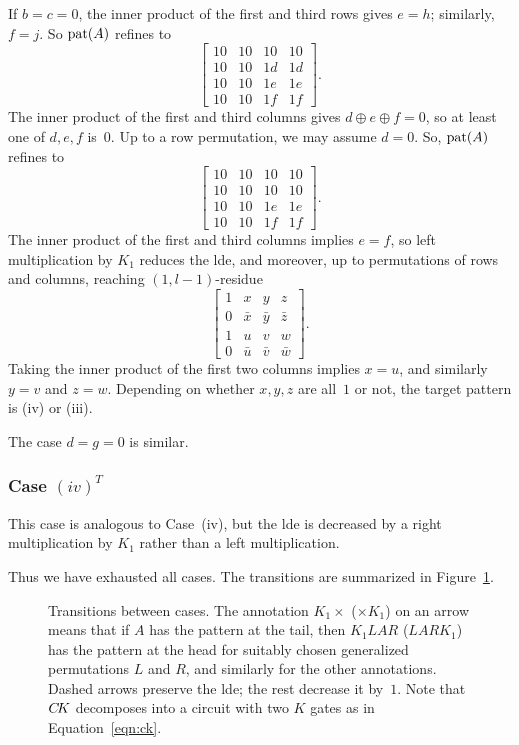 \documentclass[reprint,amsmath,amssymb,aps,pra]{revtex4-2}
\begin{document}
If $b=c=0$, the inner product of the first and third rows gives $e=h$;
similarly, $f=j$. So $\operatorname{pat}(A)$ refines to
\[
  \begin{bmatrix}
    10 & 10 & 10 & 10 \\
    10 & 10 & 1d & 1d \\
    10 & 10 & 1e & 1e \\
    10 & 10 & 1f & 1f
  \end{bmatrix}.
\]
The inner product of the first and third columns gives
$d\oplus e \oplus f = 0$, so at least one of $d,e,f$ is~$0$. Up to a
row permutation, we may assume $d=0$. So, $\operatorname{pat}(A)$ refines to
\[
  \begin{bmatrix}
    10 & 10 & 10 & 10 \\
    10 & 10 & 10 & 10 \\
    10 & 10 & 1e & 1e \\
    10 & 10 & 1f & 1f
  \end{bmatrix}.
\]
The inner product of the first and third columns implies $e=f$, so
left multiplication by $K_1$ reduces the lde, and moreover, up to
permutations of rows and columns, reaching $(1, l-1)$-residue
\[
  \begin{bmatrix}
    1 & x       & y       & z       \\
    0 & \bar{x} & \bar{y} & \bar{z} \\
    1 & u       & v       & w       \\
    0 & \bar{u} & \bar{v} & \bar{w}
  \end{bmatrix}.
\]
Taking the inner product of the first two columns implies $x=u$, and
similarly $y=v$ and $z = w$. Depending on whether $x,y,z$ are all~$1$
or not, the target pattern is (iv) or (iii).

The case $d=g=0$ is similar.

\subsubsection{Case $(iv)^T$}

This case is analogous to Case~(iv), but the lde is decreased by a
right multiplication by $K_1$ rather than a left multiplication.

Thus we have exhausted all cases. The transitions are summarized in
Figure~\ref{fig:trans}.

\begin{figure}[h]
  \centering {}
  \caption{Transitions between cases. The annotation $K_1\times$
    ($\times K_1$) on an arrow means that if $A$ has the pattern at
    the tail, then $K_1LAR$ ($LARK_1$) has the pattern at the head for
    suitably chosen generalized permutations $L$ and $R$, and
    similarly for the other annotations. Dashed arrows preserve the
    lde; the rest decrease it by~$1$. Note that $C\kern-.16667em K$ decomposes into
    a circuit with two $K$ gates as in Equation~\eqref{eqn:ck}.}
  \label{fig:trans}
\end{figure}
\end{document}
